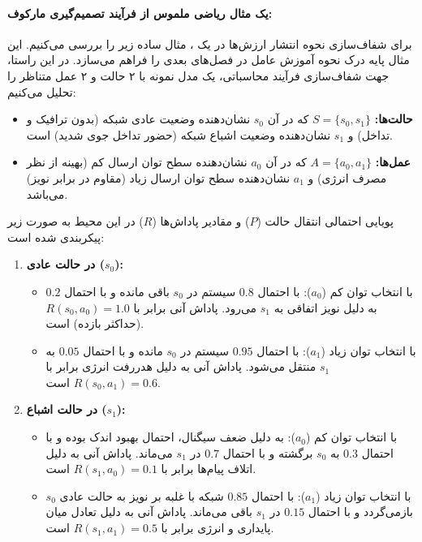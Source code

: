 \documentclass[oneside,openany,phd]{TMU-Thesis}
\begin{document}
\paragraph{یک مثال ریاضی ملموس از فرآیند تصمیم‌گیری مارکوف:}
برای شفاف‌سازی نحوه انتشار ارزش‌ها در یک ، مثال ساده زیر را بررسی می‌کنیم. این مثال پایه درک نحوه آموزش عامل در فصل‌های بعدی را فراهم می‌سازد. در این راستا، جهت شفاف‌سازی فرآیند محاسباتی، یک مدل نمونه با ۲ حالت و ۲ عمل متناظر را تحلیل می‌کنیم:
\begin{itemize}
    \item \textbf{حالت‌ها:} $S = \{s_0, s_1\}$ که در آن $s_0$ نشان‌دهنده وضعیت عادی شبکه (بدون ترافیک و تداخل) و $s_1$ نشان‌دهنده وضعیت اشباع شبکه (حضور تداخل جوی شدید) است.
    \item \textbf{عمل‌ها:} $A = \{a_0, a_1\}$ که در آن $a_0$ نشان‌دهنده سطح توان ارسال کم (بهینه از نظر مصرف انرژی) و $a_1$ نشان‌دهنده سطح توان ارسال زیاد (مقاوم در برابر نویز) می‌باشد.
\end{itemize}

پویایی احتمالی انتقال حالت ($P$) و مقادیر پاداش‌ها ($R$) در این محیط به صورت زیر پیکربندی شده است:
\begin{enumerate}
    \item \textbf{در حالت عادی ($s_0$):}
    \begin{itemize}
        \item با انتخاب توان کم ($a_0$): با احتمال $0.8$ سیستم در $s_0$ باقی مانده و با احتمال $0.2$ به دلیل نویز اتفاقی به $s_1$ می‌رود. پاداش آنی برابر با $R(s_0, a_0) = 1.0$ (حداکثر بازده) است.
        \item با انتخاب توان زیاد ($a_1$): با احتمال $0.95$ سیستم در $s_0$ مانده و با احتمال $0.05$ به $s_1$ منتقل می‌شود. پاداش آنی به دلیل هدررفت انرژی برابر با $R(s_0, a_1) = 0.6$ است.
    \end{itemize}
    \item \textbf{در حالت اشباع ($s_1$):}
    \begin{itemize}
        \item با انتخاب توان کم ($a_0$): به دلیل ضعف سیگنال، احتمال بهبود اندک بوده و با احتمال $0.3$ به $s_0$ برگشته و با احتمال $0.7$ در $s_1$ می‌ماند. پاداش آنی به دلیل اتلاف پیام‌ها برابر با $R(s_1, a_0) = 0.1$ است.
        \item با انتخاب توان زیاد ($a_1$): با احتمال $0.85$ شبکه با غلبه بر نویز به حالت عادی $s_0$ بازمی‌گردد و با احتمال $0.15$ در $s_1$ باقی می‌ماند. پاداش آنی به دلیل تعادل میان پایداری و انرژی برابر با $R(s_1, a_1) = 0.5$ است.
    \end{itemize}
\end{enumerate}
\end{document}
